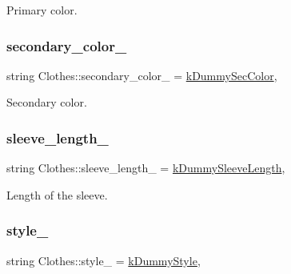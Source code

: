 Primary color. 

\mbox{\label{classClothes_ab8f55f67b956b25d71260cffcf273673}} 
\subsubsection{\texorpdfstring{secondary\+\_\+color\+\_\+}{secondary\_color\_}}
{\footnotesize\ttfamily string Clothes\+::secondary\+\_\+color\+\_\+ = \mbox{\hyperlink{clothes_8h_a71c39811135425d881af7760da63a73a}{k\+Dummy\+Sec\+Color}}\hspace{0.3cm}{\ttfamily [protected]}, {\ttfamily [inherited]}}



Secondary color. 

\mbox{\label{classClothes_a012aeb71e62ebaf9b5b5dd700cc8d5db}} 
\subsubsection{\texorpdfstring{sleeve\+\_\+length\+\_\+}{sleeve\_length\_}}
{\footnotesize\ttfamily string Clothes\+::sleeve\+\_\+length\+\_\+ = \mbox{\hyperlink{clothes_8h_a0f53dde6a2c4c344bb7da50655497350}{k\+Dummy\+Sleeve\+Length}}\hspace{0.3cm}{\ttfamily [protected]}, {\ttfamily [inherited]}}



Length of the sleeve. 

\mbox{\label{classClothes_aa85ed2b95110d8c477a1aca9cb403f98}} 
\subsubsection{\texorpdfstring{style\+\_\+}{style\_}}
{\footnotesize\ttfamily string Clothes\+::style\+\_\+ = \mbox{\hyperlink{clothes_8h_a9deec6ed1f40928bfa0040eeab95ed6b}{k\+Dummy\+Style}}\hspace{0.3cm}{\ttfamily [protected]}, {\ttfamily [inherited]}}




